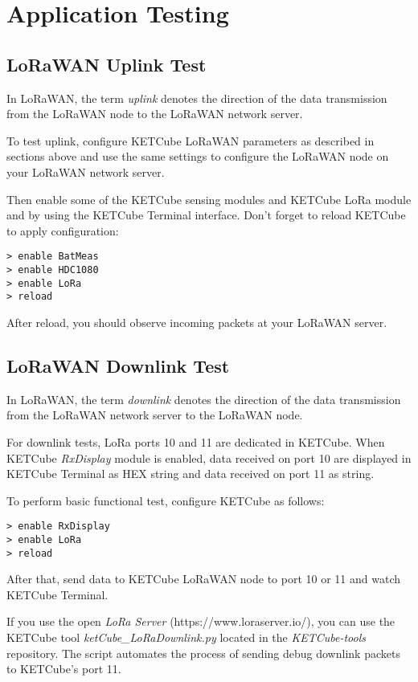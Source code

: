 \clearpage
\section{Application Testing}
\subsection{LoRaWAN Uplink Test}
In LoRaWAN, the term {\it uplink} denotes the direction of the data transmission from the LoRaWAN node to the LoRaWAN network server.

To test uplink, configure KETCube LoRaWAN parameters as described in sections above and use the same settings to configure the LoRaWAN node on your LoRaWAN network server.

Then enable some of the KETCube sensing modules and KETCube LoRa module and by using the KETCube Terminal interface. Don't forget to reload KETCube to apply configuration:

\begin{Verbatim}[frame=single, fontsize=\small]
> enable BatMeas
> enable HDC1080
> enable LoRa
> reload
\end{Verbatim}

After reload, you should observe incoming packets at your LoRaWAN server.

\subsection{LoRaWAN Downlink Test}
In LoRaWAN, the term {\it downlink} denotes the direction of the data transmission from the LoRaWAN network server to the LoRaWAN node.

For downlink tests, LoRa ports 10 and 11 are dedicated in KETCube. When KETCube {\it RxDisplay} module is enabled, data received on port 10 are displayed in KETCube Terminal as HEX string and data received on port 11 as string.

To perform basic functional test, configure KETCube as follows:
\begin{Verbatim}[frame=single, fontsize=\small]
> enable RxDisplay
> enable LoRa
> reload
\end{Verbatim}

After that, send data to KETCube LoRaWAN node to port 10 or 11 and watch KETCube Terminal.

If you use the open {\it LoRa Server} ({https://www.loraserver.io/}), you can use the KETCube tool {\it ketCube\_LoRaDownlink.py} located in the {\it KETCube-tools} repository. The script automates the process of sending debug downlink packets to KETCube's port 11.


\clearpage





